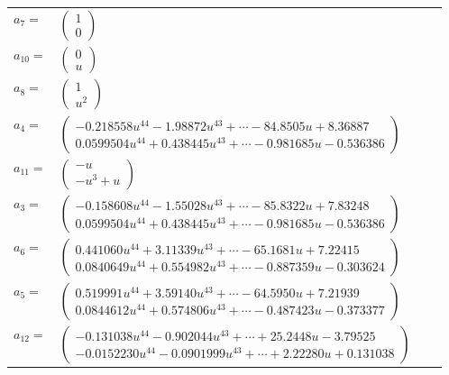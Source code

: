 \documentclass[1p]{elsarticle_modified}
\theoremstyle{definition}
\begin{document}
\begin{tabular}{m{7pt} m{180pt} m{7pt} m{180pt} }
\flushright $a_{7}=$&$\begin{pmatrix}1\\0\end{pmatrix}$ \\
\flushright $a_{10}=$&$\begin{pmatrix}0\\u\end{pmatrix}$ \\
\flushright $a_{8}=$&$\begin{pmatrix}1\\u^2\end{pmatrix}$ \\
\flushright $a_{4}=$&$\begin{pmatrix}-0.218558 u^{44}-1.98872 u^{43}+\cdots-84.8505 u+8.36887\\0.0599504 u^{44}+0.438445 u^{43}+\cdots-0.981685 u-0.536386\end{pmatrix}$ \\
\flushright $a_{11}=$&$\begin{pmatrix}- u\\- u^3+u\end{pmatrix}$ \\
\flushright $a_{3}=$&$\begin{pmatrix}-0.158608 u^{44}-1.55028 u^{43}+\cdots-85.8322 u+7.83248\\0.0599504 u^{44}+0.438445 u^{43}+\cdots-0.981685 u-0.536386\end{pmatrix}$ \\
\flushright $a_{6}=$&$\begin{pmatrix}0.441060 u^{44}+3.11339 u^{43}+\cdots-65.1681 u+7.22415\\0.0840649 u^{44}+0.554982 u^{43}+\cdots-0.887359 u-0.303624\end{pmatrix}$ \\
\flushright $a_{5}=$&$\begin{pmatrix}0.519991 u^{44}+3.59140 u^{43}+\cdots-64.5950 u+7.21939\\0.0844612 u^{44}+0.574806 u^{43}+\cdots-0.487423 u-0.373377\end{pmatrix}$ \\
\flushright $a_{12}=$&$\begin{pmatrix}-0.131038 u^{44}-0.902044 u^{43}+\cdots+25.2448 u-3.79525\\-0.0152230 u^{44}-0.0901999 u^{43}+\cdots+2.22280 u+0.131038\end{pmatrix}$ \\

\end{tabular}
\end{document}
